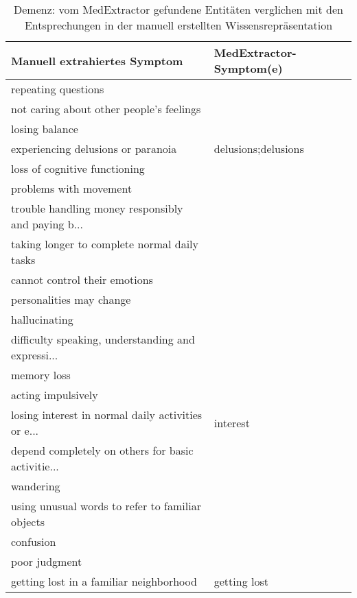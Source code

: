 \begin{table}[H]
\begin{center}
\begin{tabular}{ll}
\toprule
                      Manuell extrahiertes Symptom &       MedExtractor-Symptom(e) \\
\midrule
                               repeating questions &                     \\
          not caring about other people’s feelings &                     \\
                                    losing balance &                     \\
                experiencing delusions or paranoia & delusions;delusions \\
                     loss of cognitive functioning &                     \\
                            problems with movement &                     \\
trouble handling money responsibly and paying b... &                     \\
      taking longer to complete normal daily tasks &                     \\
                     cannot control their emotions &                     \\
                          personalities may change &                     \\
                                     hallucinating &                     \\
difficulty speaking, understanding and expressi... &                     \\
                                       memory loss &                     \\
                                acting impulsively &                     \\
losing interest in normal daily activities or e... &            interest \\
depend completely on others for basic activitie... &                     \\
                                         wandering &                     \\
  using unusual words to refer to familiar objects &                     \\
                                         confusion &                     \\
                                     poor judgment &                     \\
           getting lost in a familiar neighborhood &        getting lost \\
\bottomrule
\end{tabular}
\caption{Demenz: vom MedExtractor gefundene Entitäten verglichen mit den Entsprechungen in der manuell erstellten Wissensrepräsentation}
\label{tab:dementia_medextractor_manuell}
\end{center}
\end{table}

